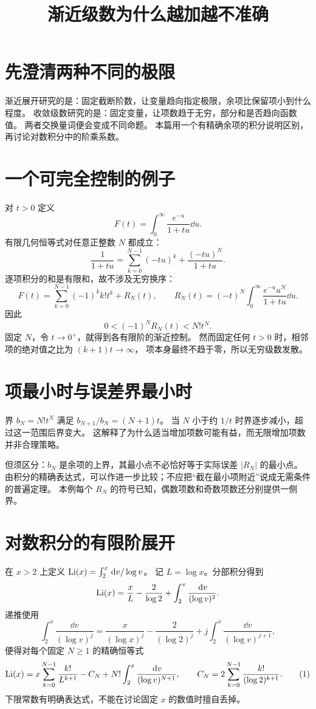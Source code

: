 \documentclass[UTF8,fontset=fandol,11pt]{ctexart}
\title{渐近级数为什么越加越不准确}
\begin{document}
\maketitle
\draftnotice
\section{先澄清两种不同的极限}
渐近展开研究的是：固定截断阶数，让变量趋向指定极限，余项比保留项小到什么程度。
收敛级数研究的是：固定变量，让项数趋于无穷，部分和是否趋向函数值。
两者交换量词便会变成不同命题。
本篇用一个有精确余项的积分说明区别，再讨论对数积分中的阶乘系数。

\section{一个可完全控制的例子}
对 $t>0$ 定义
\[
 F(t)=\int_0^\infty\frac{e^{-u}}{1+tu}\dd u.
\]
有限几何恒等式对任意正整数 $N$ 都成立：
\[
 \frac1{1+tu}=\sum_{k=0}^{N-1}(-tu)^k+\frac{(-tu)^N}{1+tu}.
\]
逐项积分的和是有限和，故不涉及无穷换序：
\[
 F(t)=\sum_{k=0}^{N-1}(-1)^kk!t^k+R_N(t),\qquad
 R_N(t)=(-t)^N\int_0^\infty\frac{e^{-u}u^N}{1+tu}\dd u.
\]
因此
\[
 0<(-1)^NR_N(t)<N!t^N.
\]
固定 $N$，令 $t\to0^+$，就得到各有限阶的渐近控制。
然而固定任何 $t>0$ 时，相邻项的绝对值之比为 $(k+1)t\to\infty$，
项本身最终不趋于零，所以无穷级数发散。

\section{项最小时与误差界最小时}
界 $b_N=N!t^N$ 满足 $b_{N+1}/b_N=(N+1)t$。
当 $N$ 小于约 $1/t$ 时界逐步减小，超过这一范围后界变大。
这解释了为什么适当增加项数可能有益，而无限增加项数并非合理策略。

但须区分：$b_N$ 是余项的上界，其最小点不必恰好等于实际误差 $|R_N|$ 的最小点。
由积分的精确表达式，可以作进一步比较；不应把“截在最小项附近”说成无需条件的普遍定理。
本例每个 $R_N$ 的符号已知，偶数项数和奇数项数还分别提供一侧界。

\section{对数积分的有限阶展开}
在 $x>2$ 上定义 $\operatorname{Li}(x)=\int_2^x\,\mathrm d v/\log v$。
记 $L=\log x$。分部积分得到
\[
 \operatorname{Li}(x)=\frac{x}{L}-\frac2{\log2}
        +\int_2^x\frac{\,\mathrm d v}{(\log v)^2}.
\]
递推使用
\[
 \int_2^x\frac{\dd v}{(\log v)^j}
 =\frac{x}{(\log x)^j}-\frac2{(\log2)^j}
  +j\int_2^x\frac{\dd v}{(\log v)^{j+1}},
\]
便得对每个固定 $N\ge1$ 的精确恒等式
\[
 \operatorname{Li}(x)=x\sum_{k=0}^{N-1}\frac{k!}{L^{k+1}}
       -C_N+N!\int_2^x\frac{\,\mathrm d v}{(\log v)^{N+1}},
 \qquad
 C_N=2\sum_{k=0}^{N-1}\frac{k!}{(\log2)^{k+1}}.   \tag{1}
\]
下限常数有明确表达式，不能在讨论固定 $x$ 的数值时擅自丢掉。
\end{document}
